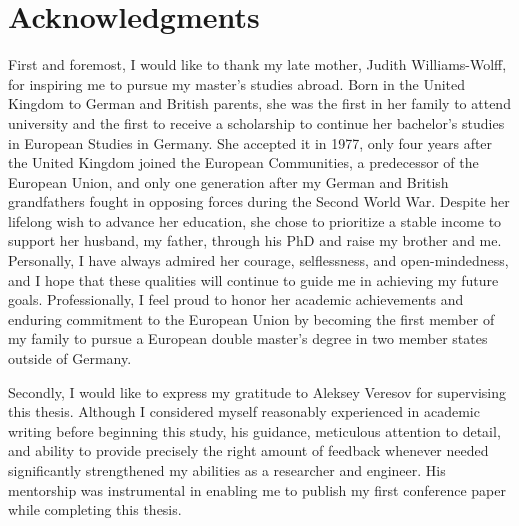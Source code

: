 \documentclass[
english,                 %
bibtex,                  %
]{kththesis}
\numberwithin{listing}{chapter}
\begin{document}
\cleardoublepage
{}

\cleardoublepage
\iftoggle{includeExtraAbstracts}{
%



}{} %

\section*{Acknowledgments}

First and foremost, I would like to thank my late mother, Judith Williams-Wolff, for inspiring me to pursue my master's studies abroad. Born in the United Kingdom to German and British parents, she was the first in her family to attend university and the first to receive a scholarship to continue her bachelor's studies in European Studies in Germany. She accepted it in 1977, only four years after the United Kingdom joined the European Communities, a predecessor of the European Union, and only one generation after my German and British grandfathers fought in opposing forces during the Second World War. Despite her lifelong wish to advance her education, she chose to prioritize a stable income to support her husband, my father, through his PhD and raise my brother and me. Personally, I have always admired her courage, selflessness, and open-mindedness, and I hope that these qualities will continue to guide me in achieving my future goals. Professionally, I feel proud to honor her academic achievements and enduring commitment to the European Union by becoming the first member of my family to pursue a European double master's degree in two member states outside of Germany.

Secondly, I would like to express my gratitude to Aleksey Veresov for supervising this thesis. Although I considered myself reasonably experienced in academic writing before beginning this study, his guidance, meticulous attention to detail, and ability to provide precisely the right amount of feedback whenever needed significantly strengthened my abilities as a researcher and engineer. His mentorship was instrumental in enabling me to publish my first conference paper while completing this thesis.
\end{document}
